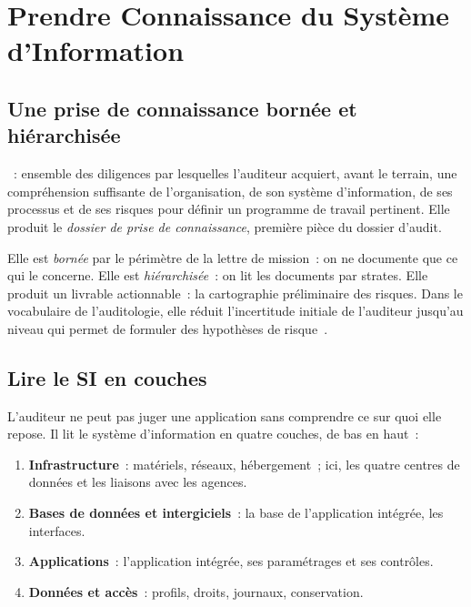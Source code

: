 \section{Prendre Connaissance du Système d'Information}
\label{sec:c06-connaissance}

\subsection{Une prise de connaissance bornée et hiérarchisée}

\begin{boxdef}
~: ensemble des
diligences par lesquelles l'auditeur acquiert, avant le terrain, une
compréhension suffisante de l'organisation, de son système d'information,
de ses processus et de ses risques pour définir un programme de travail
pertinent. Elle produit le \emph{dossier de prise de connaissance}, première
pièce du dossier d'audit.
\end{boxdef}

Elle est \emph{bornée} par le périmètre de la lettre de mission~: on ne
documente que ce qui le concerne. Elle est \emph{hiérarchisée}~: on lit les
documents par strates. Elle produit un livrable actionnable~: la
cartographie préliminaire des risques. Dans le vocabulaire de
l'auditologie, elle réduit l'incertitude initiale de l'auditeur jusqu'au
niveau qui permet de formuler des hypothèses de risque~\cite{minka2026auditologie}.

\subsection{Lire le SI en couches}

L'auditeur ne peut pas juger une application sans comprendre ce sur quoi
elle repose. Il lit le système d'information en quatre couches, de bas en
haut~:
\begin{enumerate}
    \item \textbf{Infrastructure}~: matériels, réseaux, hébergement~; ici,
          les quatre centres de données et les liaisons avec les agences.
    \item \textbf{Bases de données et intergiciels}~: la base de
          l'application intégrée, les interfaces.
    \item \textbf{Applications}~: l'application intégrée, ses paramétrages et
          ses contrôles.
    \item \textbf{Données et accès}~: profils, droits, journaux, conservation.
\end{enumerate}

